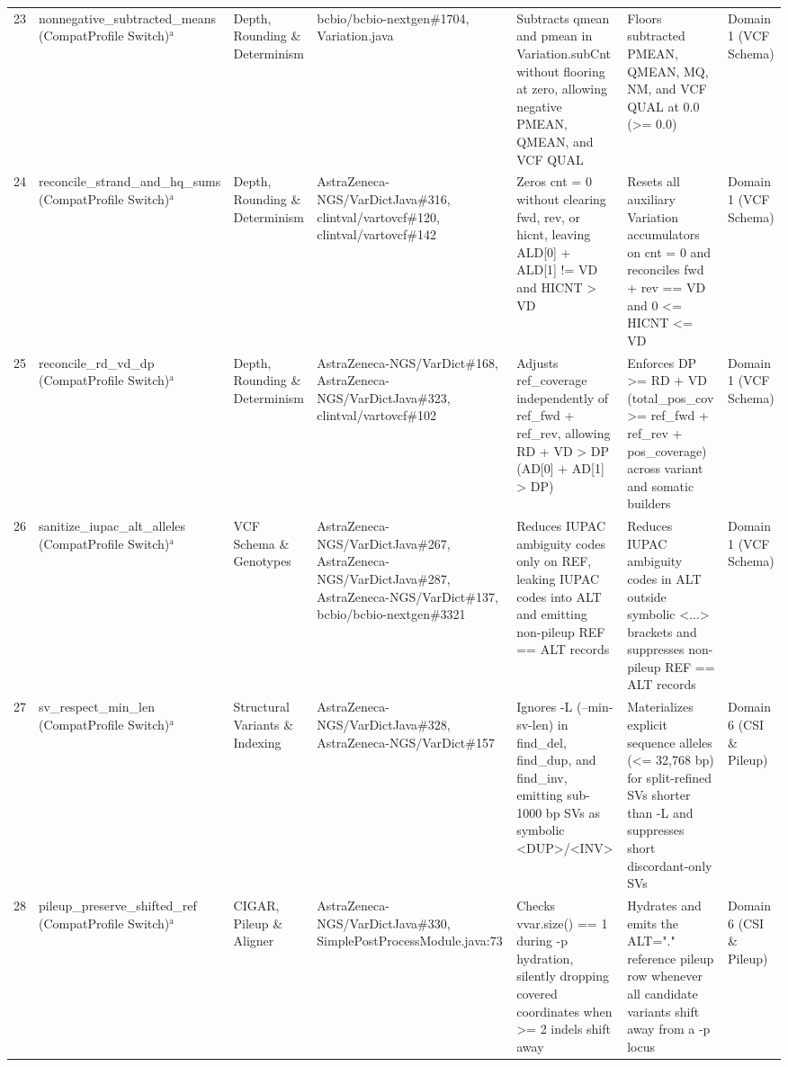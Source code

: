 \begin{table}[htbp]
{\begin{tabular}{lllllll}
23 & nonnegative\_subtracted\_means (CompatProfile Switch)$^{\text{a}}$ & Depth, Rounding \& Determinism & bcbio/bcbio-nextgen\#1704, Variation.java & Subtracts qmean and pmean in Variation.subCnt without flooring at zero, allowing negative PMEAN, QMEAN, and VCF QUAL & Floors subtracted PMEAN, QMEAN, MQ, NM, and VCF QUAL at 0.0 (\textgreater{}= 0.0) & Domain 1 (VCF Schema) \\
24 & reconcile\_strand\_and\_hq\_sums (CompatProfile Switch)$^{\text{a}}$ & Depth, Rounding \& Determinism & AstraZeneca-NGS/VarDictJava\#316, clintval/vartovcf\#120, clintval/vartovcf\#142 & Zeros cnt = 0 without clearing fwd, rev, or hicnt, leaving ALD[0] + ALD[1] != VD and HICNT \textgreater{} VD & Resets all auxiliary Variation accumulators on cnt = 0 and reconciles fwd + rev == VD and 0 \textless{}= HICNT \textless{}= VD & Domain 1 (VCF Schema) \\
25 & reconcile\_rd\_vd\_dp (CompatProfile Switch)$^{\text{a}}$ & Depth, Rounding \& Determinism & AstraZeneca-NGS/VarDict\#168, AstraZeneca-NGS/VarDictJava\#323, clintval/vartovcf\#102 & Adjusts ref\_coverage independently of ref\_fwd + ref\_rev, allowing RD + VD \textgreater{} DP (AD[0] + AD[1] \textgreater{} DP) & Enforces DP \textgreater{}= RD + VD (total\_pos\_cov \textgreater{}= ref\_fwd + ref\_rev + pos\_coverage) across variant and somatic builders & Domain 1 (VCF Schema) \\
26 & sanitize\_iupac\_alt\_alleles (CompatProfile Switch)$^{\text{a}}$ & VCF Schema \& Genotypes & AstraZeneca-NGS/VarDictJava\#267, AstraZeneca-NGS/VarDictJava\#287, AstraZeneca-NGS/VarDict\#137, bcbio/bcbio-nextgen\#3321 & Reduces IUPAC ambiguity codes only on REF, leaking IUPAC codes into ALT and emitting non-pileup REF == ALT records & Reduces IUPAC ambiguity codes in ALT outside symbolic \textless{}...\textgreater{} brackets and suppresses non-pileup REF == ALT records & Domain 1 (VCF Schema) \\
27 & sv\_respect\_min\_len (CompatProfile Switch)$^{\text{a}}$ & Structural Variants \& Indexing & AstraZeneca-NGS/VarDictJava\#328, AstraZeneca-NGS/VarDict\#157 & Ignores -L (--min-sv-len) in find\_del, find\_dup, and find\_inv, emitting sub-1000 bp SVs as symbolic \textless{}DUP\textgreater{}/\textless{}INV\textgreater{} & Materializes explicit sequence alleles (\textless{}= 32,768 bp) for split-refined SVs shorter than -L and suppresses short discordant-only SVs & Domain 6 (CSI \& Pileup) \\
28 & pileup\_preserve\_shifted\_ref (CompatProfile Switch)$^{\text{a}}$ & CIGAR, Pileup \& Aligner & AstraZeneca-NGS/VarDictJava\#330, SimplePostProcessModule.java:73 & Checks vvar.size() == 1 during -p hydration, silently dropping covered coordinates when \textgreater{}= 2 indels shift away & Hydrates and emits the ALT="." reference pileup row whenever all candidate variants shift away from a -p locus & Domain 6 (CSI \& Pileup) \\

\end{tabular}}
\end{table}
